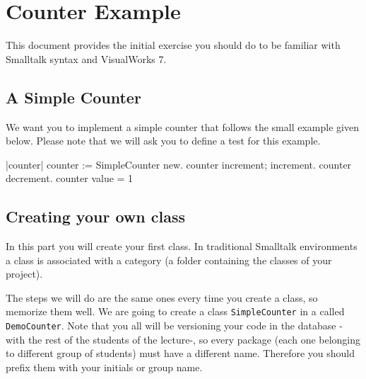 \ifx\wholebook\relax\else


\fi


\chapter{Counter Example}
This document provides the initial exercise you should do to be
familiar with Smalltalk syntax and VisualWorks 7.


\section*{A Simple Counter}
We want you to implement a simple counter that follows the small example given
below. Please note that we will ask you to define a test for this example.

\begin{code}
|counter|
counter := SimpleCounter new.
counter increment; increment.
counter decrement.
counter value = 1
\end{code}


\section*{Creating your own class}
In this part you will create your first class. In traditional Smalltalk environments a class is associated with a category (a folder containing the classes of your project).

 The steps we will do are
the same ones every  time you create a class, so memorize them
well. We are going to create a class \texttt{SimpleCounter} in a
\category called \texttt{DemoCounter}. Note that you all will be
versioning your code in the \store database -with the rest of the
students of the lecture-, so every package (each one belonging to
different group of students) must have a different name. Therefore you
should prefix them with your initials or group name.

